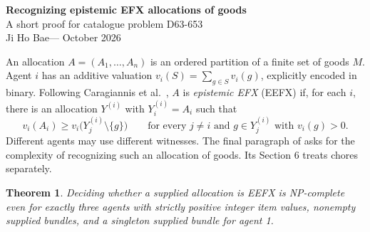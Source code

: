 \documentclass[11pt]{article}
\newtheorem{theorem}{Theorem}
\begin{document}
\begin{center}
{\Large\bfseries Recognizing epistemic EFX allocations of goods}\\[5pt]
{\small A short proof for catalogue problem D63-653}\\[3pt]
{\small Ji Ho Bae\quad--- October 2026}
\end{center}

An allocation $A=(A_1,\ldots,A_n)$ is an ordered partition of a finite
set of goods $M$. Agent $i$ has an additive valuation
$v_i(S)=\sum_{g\in S}v_i(g)$, explicitly encoded in binary.
Following Caragiannis et al.~\cite[Definitions 1--2]{fairness},
$A$ is \emph{epistemic EFX} (EEFX) if, for each $i$, there is an allocation
$Y^{(i)}$ with $Y^{(i)}_i=A_i$ such that
\[
 v_i(A_i)\geq v_i\bigl(Y^{(i)}_j\setminus\{g\}\bigr)
 \qquad\text{for every }j\ne i\text{ and }g\in Y^{(i)}_j
 \text{ with }v_i(g)>0.
\]
Different agents may use different witnesses. The final paragraph of
\cite[Section 4]{fairness} asks for the complexity of recognizing such an
allocation of goods. Its Section 6 treats chores separately.

\begin{theorem}
Deciding whether a supplied allocation is EEFX is NP-complete even for
exactly three agents with strictly positive integer item values, nonempty
supplied bundles, and a singleton supplied bundle for agent 1.
\end{theorem}
\end{document}
